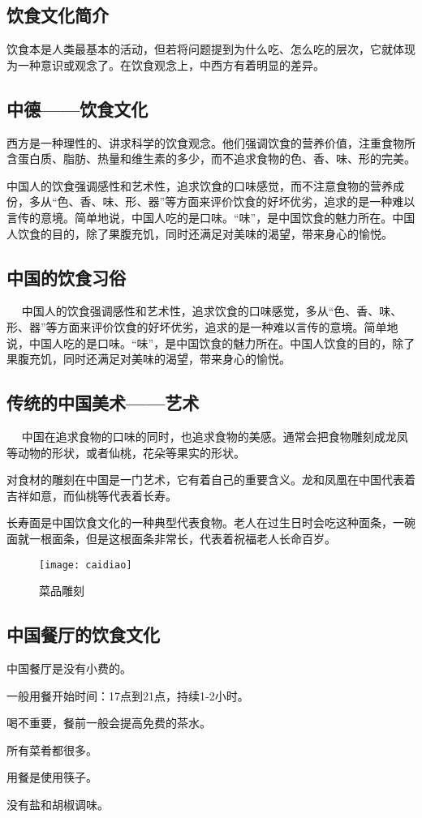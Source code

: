 \subsection{饮食文化简介}
    饮食本是人类最基本的活动，但若将问题提到为什么吃、怎么吃的层次，它就体现为一种意识或观念了。在饮食观念上，中西方有着明显的差异。

\subsection{中德——饮食文化}
    西方是一种理性的、讲求科学的饮食观念。他们强调饮食的营养价值，注重食物所含蛋白质、脂肪、热量和维生素的多少，而不追求食物的色、香、味、形的完美。 

    中国人的饮食强调感性和艺术性，追求饮食的口味感觉，而不注意食物的营养成份，多从“色、香、味、形、器”等方面来评价饮食的好坏优劣，追求的是一种难以言传的意境。简单地说，中国人吃的是口味。“味”，是中国饮食的魅力所在。中国人饮食的目的，除了果腹充饥，同时还满足对美味的渴望，带来身心的愉悦。

\subsection{中国的饮食习俗}
    中国人的饮食强调感性和艺术性，追求饮食的口味感觉，多从“色、香、味、形、器”等方面来评价饮食的好坏优劣，追求的是一种难以言传的意境。简单地说，中国人吃的是口味。“味”，是中国饮食的魅力所在。中国人饮食的目的，除了果腹充饥，同时还满足对美味的渴望，带来身心的愉悦。

\subsection{传统的中国美术——艺术}
    中国在追求食物的口味的同时，也追求食物的美感。通常会把食物雕刻成龙凤等动物的形状，或者仙桃，花朵等果实的形状。

    对食材的雕刻在中国是一门艺术，它有着自己的重要含义。龙和凤凰在中国代表着吉祥如意，而仙桃等代表着长寿。 

    长寿面是中国饮食文化的一种典型代表食物。老人在过生日时会吃这种面条，一碗面就一根面条，但是这根面条非常长，代表着祝福老人长命百岁。 

    \begin{figure}[htb]
        \centering
        \texttt{[image: caidiao]}
        \caption{菜品雕刻}
    \end{figure}

\subsection{中国餐厅的饮食文化}
\item 中国餐厅是没有小费的。 
\item 一般用餐开始时间：17点到21点，持续1-2小时。 
\item 喝不重要，餐前一般会提高免费的茶水。 
\item 所有菜肴都很多。 
\item 用餐是使用筷子。 
\item 没有盐和胡椒调味。

